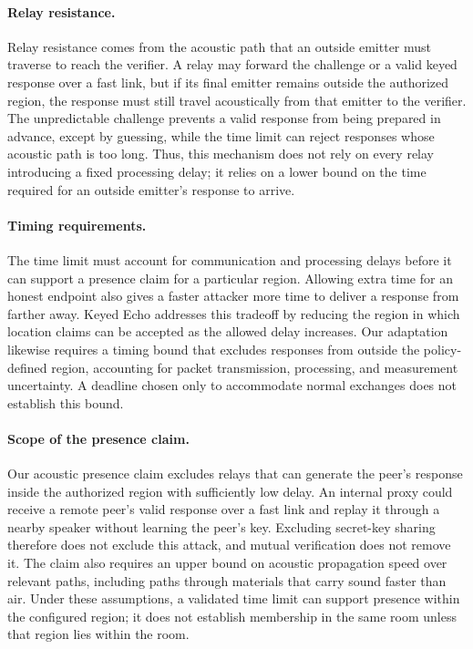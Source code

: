 \documentclass[sigconf,authordraft]{acmart}
\begin{document}
\paragraph{Relay resistance.}
Relay resistance comes from the acoustic path that an outside emitter must traverse to reach the verifier.
A relay may forward the challenge or a valid keyed response over a fast link, but if its final emitter remains outside the authorized region, the response must still travel acoustically from that emitter to the verifier.
The unpredictable challenge prevents a valid response from being prepared in advance, except by guessing, while the time limit can reject responses whose acoustic path is too long.
Thus, this mechanism does not rely on every relay introducing a fixed processing delay; it relies on a lower bound on the time required for an outside emitter's response to arrive.

\paragraph{Timing requirements.}
The time limit must account for communication and processing delays before it can support a presence claim for a particular region.
Allowing extra time for an honest endpoint also gives a faster attacker more time to deliver a response from farther away.
Keyed Echo addresses this tradeoff by reducing the region in which location claims can be accepted as the allowed delay increases.
Our adaptation likewise requires a timing bound that excludes responses from outside the policy-defined region, accounting for packet transmission, processing, and measurement uncertainty.
A deadline chosen only to accommodate normal exchanges does not establish this bound.

\paragraph{Scope of the presence claim.}
Our acoustic presence claim excludes relays that can generate the peer's response inside the authorized region with sufficiently low delay.
An internal proxy could receive a remote peer's valid response over a fast link and replay it through a nearby speaker without learning the peer's key.
Excluding secret-key sharing therefore does not exclude this attack, and mutual verification does not remove it.
The claim also requires an upper bound on acoustic propagation speed over relevant paths, including paths through materials that carry sound faster than air.
Under these assumptions, a validated time limit can support presence within the configured region; it does not establish membership in the same room unless that region lies within the room.
\end{document}
